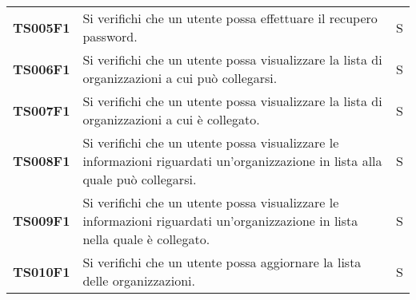 \documentclass[../../piano-di-qualifica.tex]{subfiles}
\begin{document}
\begin{longtable}[H]{>{\centering\bfseries}m{3cm} >{}m{10cm} >{\centering\arraybackslash}m{3cm}}
  TS005F1            & Si verifichi che un utente possa effettuare il recupero password.
                     & S                                                                                                                                                                                                                                                   \\

  TS006F1            & Si verifichi che un utente possa visualizzare la lista di organizzazioni a cui può collegarsi.
                     & S                                                                                                                                                                                                                                                   \\

  TS007F1            & Si verifichi che un utente possa visualizzare la lista di organizzazioni a cui è collegato.
                     & S                                                                                                                                                                                                                                                   \\

  TS008F1            & Si verifichi che un utente possa visualizzare le informazioni riguardati un'organizzazione in lista alla quale può collegarsi.
                     & S                                                                                                                                                                                                                                                   \\

  TS009F1            & Si verifichi che un utente possa visualizzare le informazioni riguardati un'organizzazione in lista nella quale è collegato.
                     & S                                                                                                                                                                                                                                                   \\


  TS010F1            & Si verifichi che un utente possa aggiornare la lista delle organizzazioni.
                     & S                                                                                                                                                                                                                                                   \\


\end{longtable}
\end{document}
